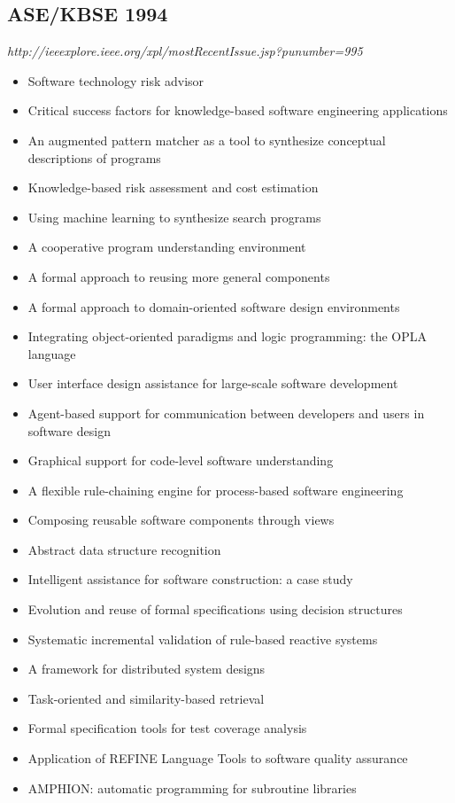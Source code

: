 \subsection{ASE/KBSE 1994}

{\small \em http://ieeexplore.ieee.org/xpl/mostRecentIssue.jsp?punumber=995}

{\small
\begin{itemize}[itemsep=-1ex]
  \item Software technology risk advisor
  \item Critical success factors for knowledge-based software engineering applications
  \item An augmented pattern matcher as a tool to synthesize conceptual descriptions of programs
  \item Knowledge-based risk assessment and cost estimation
  \item Using machine learning to synthesize search programs
  \item A cooperative program understanding environment
  \item A formal approach to reusing more general components
  \item A formal approach to domain-oriented software design environments
  \item Integrating object-oriented paradigms and logic programming: the OPLA language
  \item User interface design assistance for large-scale software development
  \item Agent-based support for communication between developers and users in software design
  \item Graphical support for code-level software understanding
  \item A flexible rule-chaining engine for process-based software engineering
  \item Composing reusable software components through views
  \item Abstract data structure recognition
  \item Intelligent assistance for software construction: a case study
  \item Evolution and reuse of formal specifications using decision structures
  \item Systematic incremental validation of rule-based reactive systems
  \item A framework for distributed system designs
  \item Task-oriented and similarity-based retrieval
  \item Formal specification tools for test coverage analysis
  \item Application of REFINE Language Tools to software quality assurance
  \item AMPHION: automatic programming for subroutine libraries 
\end{itemize}
}

